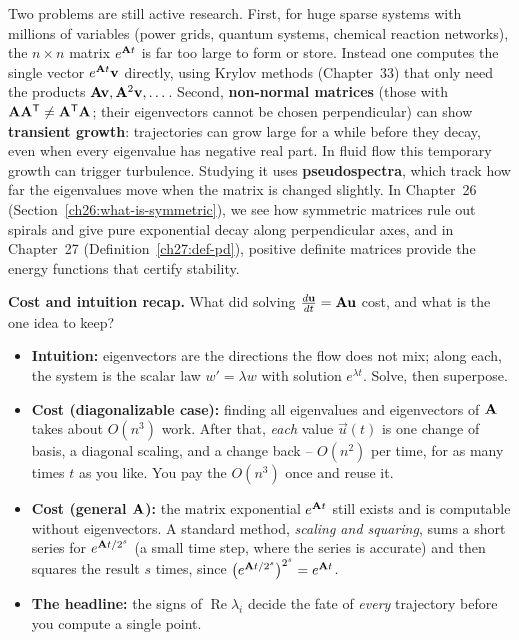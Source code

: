 \begin{historybox}
Two problems are still active research. First, for huge sparse systems with millions of variables (power grids, quantum systems, chemical reaction networks), the $n\times n$ matrix $e^{\mathbf{A}t}$ is far too large to form or store. Instead one computes the single vector $e^{\mathbf{A}t}\mathbf{v}$ directly, using Krylov methods (Chapter~33) that only need the products $\mathbf{A}\mathbf{v}, \mathbf{A}^2\mathbf{v}, \dots$. Second, \textbf{non-normal matrices} (those with $\mathbf{A}\mathbf{A}^{\mathsf{T}} \neq \mathbf{A}^{\mathsf{T}}\mathbf{A}$; their eigenvectors cannot be chosen perpendicular) can show \textbf{transient growth}: trajectories can grow large for a while before they decay, even when every eigenvalue has negative real part. In fluid flow this temporary growth can trigger turbulence. Studying it uses \textbf{pseudospectra}, which track how far the eigenvalues move when the matrix is changed slightly. In Chapter~26 (Section~\ref{ch26:what-is-symmetric}), we see how symmetric matrices rule out spirals and give pure exponential decay along perpendicular axes, and in Chapter~27 (Definition~\ref{ch27:def-pd}), positive definite matrices provide the energy functions that certify stability.
\end{historybox}

\begin{recoverybox}
\textbf{Cost and intuition recap.} What did solving
$\frac{d\mathbf{u}}{dt}=\mathbf{A}\mathbf{u}$ cost, and what is the one idea to
keep?
\begin{itemize}
  \item \textbf{Intuition:} eigenvectors are the directions the flow does not
        mix; along each, the system is the scalar law $w'=\lambda w$ with
        solution $e^{\lambda t}$. Solve, then superpose.
  \item \textbf{Cost (diagonalizable case):} finding all eigenvalues and
        eigenvectors of $\mathbf{A}$ takes about $O(n^3)$ work. After that,
        \emph{each} value $\vec{u}(t)$ is one change of basis, a diagonal
        scaling, and a change back -- $O(n^2)$ per time, for as many times $t$
        as you like. You pay the $O(n^3)$ once and reuse it.
  \item \textbf{Cost (general $\mathbf{A}$):} the matrix exponential $e^{\mathbf{A}t}$
        still exists and is computable without eigenvectors. A standard method,
        \emph{scaling and squaring}, sums a short series for
        $e^{\mathbf{A}t/2^s}$ (a small time step, where the series is accurate)
        and then squares the result $s$ times, since
        $\bigl(e^{\mathbf{A}t/2^s}\bigr)^{2^s} = e^{\mathbf{A}t}$.
  \item \textbf{The headline:} the signs of $\operatorname{Re}\lambda_i$ decide
        the fate of \emph{every} trajectory before you compute a single point.
\end{itemize}
\end{recoverybox}

